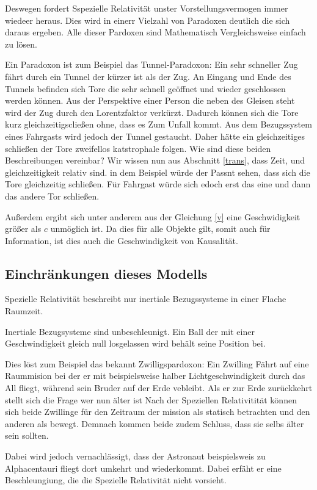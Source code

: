 \documentclass[12pt]{article}
\begin{document}
Deswegen fordert Sspezielle Relativität unster Vorstellungsvermogen immer wiedeer heraus.
Dies wird in einerr Vielzahl von Paradoxen deutlich die sich daraus ergeben.
Alle dieser Pardoxen sind Mathematisch Vergleichsweise einfach zu lösen.

Ein Paradoxon ist zum Beispiel das Tunnel-Paradoxon:
Ein sehr schneller Zug fährt durch ein Tunnel der kürzer ist als der Zug.
An Eingang und Ende des Tunnels befinden sich Tore die sehr schnell geöffnet und wieder geschlossen werden können.
Aus der Perspektive einer Person die neben des Gleisen steht wird der Zug durch den Lorentzfaktor verkürzt.
Dadurch können sich die Tore kurz gleichzeitigscließen ohne, dass es Zum Unfall kommt.
Aus dem Bezugssystem eines Fahrgasts wird jedoch der Tunnel gestaucht.
Daher hätte ein gleichzeitiges schließen der Tore zweifellos katstrophale folgen.
Wie sind diese beiden Beschreibungen vereinbar?
Wir wissen nun aus Abschnitt \ref{trans}, dass Zeit, und gleichzeitigkeit relativ sind.
in dem Beispiel würde der Passnt sehen, dass sich die Tore gleichzeitig schließen.
Für Fahrgast würde sich edoch erst das eine und dann das andere Tor schließen.

Außerdem ergibt sich unter anderem aus der Gleichung \ref{v} eine Geschwidigkeit größer als $c$ unmöglich ist.
Da dies für alle Objekte gilt, somit auch für Information,  ist dies auch die Geschwindigkeit von Kausalität.
\subsection{Einchränkungen dieses Modells}
Spezielle Relativität beschreibt nur inertiale Bezugssysteme in einer Flache Raumzeit.

Inertiale Bezugsysteme sind unbeschleunigt.
Ein Ball der mit einer Geschwindigkeit gleich null losgelassen wird behält seine Position bei.

Dies löst zum Beispiel das bekannt Zwilligspardoxon:
Ein Zwilling Fährt auf eine Raummision bei der er mit beispielsweise halber Lichtgeschwindigkeit durch das All fliegt, während sein Bruder auf der Erde vebleibt.
Als er zur Erde zurückkehrt stellt sich die Frage wer nun älter ist
Nach der Speziellen Relativitität können sich beide Zwillinge für den Zeitraum der mission als statisch betrachten und den anderen als bewegt.
Demnach kommen beide zudem Schluss, dass sie selbs älter sein sollten.

Dabei wird jedoch vernachlässigt, dass der Astronaut beispielsweis zu Alphacentauri fliegt dort umkehrt und wiederkommt.
Dabei erfäht er eine Beschleungiung, die die Spezielle Relativität nicht vorsieht.
\end{document}
